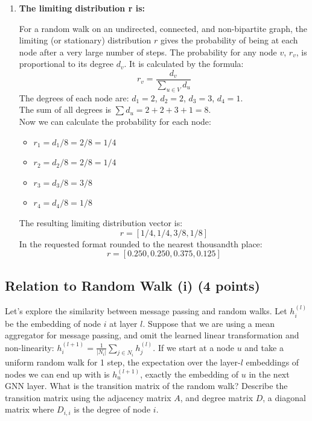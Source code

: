 \documentclass{article}
\numberwithin{figure}{section}
\begin{document}
{\begin{enumerate}
			\item \textbf{The limiting distribution r is:}
			
			For a random walk on an undirected, connected, and non-bipartite graph, the limiting (or stationary) distribution $r$ gives the probability of being at each node after a very large number of steps. The probability for any node $v$, $r_v$, is proportional to its degree $d_v$. It is calculated by the formula:
			\[ r_v = \frac{d_v}{\sum_{u \in V} d_u} \]
			The degrees of each node are: $d_1 = 2$, $d_2 = 2$, $d_3 = 3$, $d_4 = 1$.
			\\
			The sum of all degrees is $\sum d_u = 2 + 2 + 3 + 1 = 8$.
			\\
			Now we can calculate the probability for each node:
			\begin{itemize}
				\item $r_1 = d_1 / 8 = 2/8 = 1/4$
				\item $r_2 = d_2 / 8 = 2/8 = 1/4$
				\item $r_3 = d_3 / 8 = 3/8$
				\item $r_4 = d_4 / 8 = 1/8$
			\end{itemize}
			The resulting limiting distribution vector is:
			\[ r = [1/4, 1/4, 3/8, 1/8] \]
			In the requested format rounded to the nearest thousandth place:
			\[ r = [0.250, 0.250, 0.375, 0.125] \]
			\end{enumerate}
		}
	
	
	\subsection{Relation to Random Walk (i) (4 points)}
	
	Let’s explore the similarity between message passing and random walks. Let $h^{(l)}_i$ be the embedding of node $i$ at layer $l$. Suppose that we are using a mean aggregator for message passing, and omit the learned linear transformation and non-linearity: $h^{(l+1)}_i = \frac{1}{|N_i|} \sum_{j \in N_i} h^{(l)}_j$. If we start at a node $u$ and take a uniform random walk for 1 step, the expectation over the layer-$l$ embeddings
	of nodes we can end up with is $h^{(l+1)}_u$, exactly the embedding of $u$ in the next GNN layer. What is the transition matrix of the random walk? Describe the transition matrix using the adjacency matrix $A$, and degree matrix $D$, a diagonal matrix where $D_{i,i}$ is the degree of node $i$.
	
\end{document}
